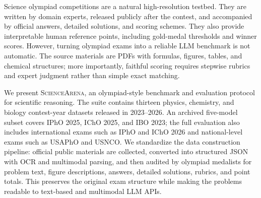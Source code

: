 \documentclass[11pt]{article}
\begin{document}
Science olympiad competitions are a natural high-resolution testbed.
They are written by domain experts, released publicly after the contest, and accompanied by official answers, detailed solutions, and scoring schemes.
They also provide interpretable human reference points, including gold-medal thresholds and winner scores.
However, turning olympiad exams into a reliable LLM benchmark is not automatic.
The source materials are PDFs with formulas, figures, tables, and chemical structures; more importantly, faithful scoring requires stepwise rubrics and expert judgment rather than simple exact matching.


We present \textsc{ScienceArena}, an olympiad-style benchmark and evaluation protocol for scientific reasoning.
The suite contains thirteen physics, chemistry, and biology contest-year datasets released in 2023--2026. An archived five-model subset covers IPhO 2025, IChO 2025, and IBO 2023; the full evaluation also includes international exams such as IPhO and IChO 2026 and national-level exams such as USAPhO and USNCO.
We standardize the data construction pipeline: official public materials are collected, converted into structured JSON with OCR and multimodal parsing, and then audited by olympiad medalists for problem text, figure descriptions, answers, detailed solutions, rubrics, and point totals.
This preserves the original exam structure while making the problems readable to text-based and multimodal LLM APIs.
\end{document}
